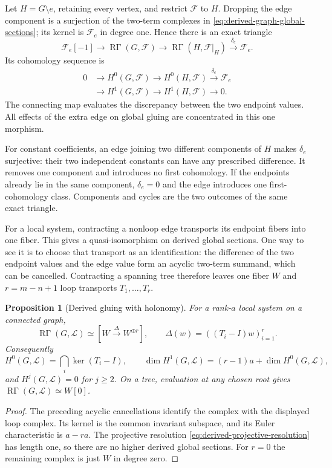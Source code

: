 \documentclass[11pt]{article}
\newtheorem{proposition}[theorem]{Proposition}
\theoremstyle{definition}
\theoremstyle{remark}
\begin{document}
Let $H=G\setminus e$, retaining every vertex, and restrict $\mathcal F$ to $H$. Dropping the edge component is a surjection of the two-term complexes in \eqref{eq:derived-graph-global-sections}; its kernel is $\mathcal F_e$ in degree one. Hence there is an exact triangle
\begin{equation}\label{eq:derived-edge-triangle}
 \mathcal F_e[-1]\longrightarrow\operatorname{R\Gamma}(G,\mathcal F)
 \longrightarrow\operatorname{R\Gamma}(H,\mathcal F|_H)
 \xrightarrow{\delta_e}\mathcal F_e.
\end{equation}
Its cohomology sequence is
\[
 \begin{aligned}
 0&\longrightarrow H^0(G,\mathcal F)\longrightarrow H^0(H,\mathcal F)
 \xrightarrow{\delta_e}\mathcal F_e\\
 &\longrightarrow H^1(G,\mathcal F)\longrightarrow H^1(H,\mathcal F)
 \longrightarrow0.
 \end{aligned}
\]
The connecting map evaluates the discrepancy between the two endpoint values. All effects of the extra edge on global gluing are concentrated in this one morphism.

For constant coefficients, an edge joining two different components of $H$ makes $\delta_e$ surjective: their two independent constants can have any prescribed difference. It removes one component and introduces no first cohomology. If the endpoints already lie in the same component, $\delta_e=0$ and the edge introduces one first-cohomology class. Components and cycles are the two outcomes of the same exact triangle.

For a local system, contracting a nonloop edge transports its endpoint fibers into one fiber. This gives a quasi-isomorphism on derived global sections. One way to see it is to choose that transport as an identification: the difference of the two endpoint values and the edge value form an acyclic two-term summand, which can be cancelled. Contracting a spanning tree therefore leaves one fiber $W$ and $r=m-n+1$ loop transports $T_1,\ldots,T_r$.

\begin{proposition}[Derived gluing with holonomy]\label{prop:derived-holonomy}
For a rank-$a$ local system on a connected graph,
\[
 \operatorname{R\Gamma}(G,\mathcal L)
 \simeq\left[W\xrightarrow{\Delta}W^{\oplus r}\right],
 \qquad\Delta(w)=((T_i-I)w)_{i=1}^r.
\]
Consequently
\[
 H^0(G,\mathcal L)=\bigcap_i\ker(T_i-I),\qquad
 \dim H^1(G,\mathcal L)=(r-1)a+\dim H^0(G,\mathcal L),
\]
and $H^j(G,\mathcal L)=0$ for $j\ge2$. On a tree, evaluation at any chosen root gives $\operatorname{R\Gamma}(G,\mathcal L)\simeq W[0]$.
\end{proposition}
\begin{proof}
The preceding acyclic cancellations identify the complex with the displayed loop complex. Its kernel is the common invariant subspace, and its Euler characteristic is $a-ra$. The projective resolution \eqref{eq:derived-projective-resolution} has length one, so there are no higher derived global sections. For $r=0$ the remaining complex is just $W$ in degree zero.
\end{proof}
\end{document}
